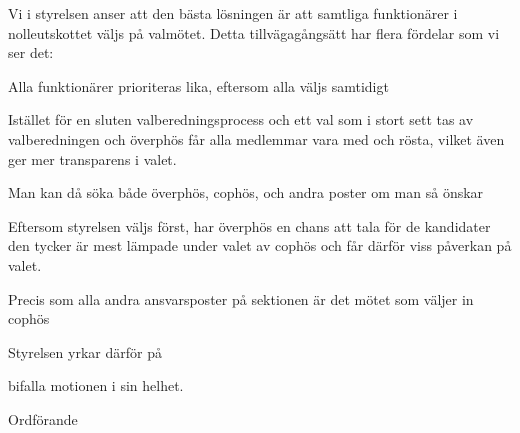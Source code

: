\documentclass[../_main/handlingar.tex]{subfiles}
\begin{document}
\motionssvar
Vi i styrelsen anser att den bästa lösningen är att samtliga funktionärer i nolleutskottet väljs på valmötet. Detta tillvägagångsätt har flera fördelar som vi ser det:

\begin{dashlist}
	\item Alla funktionärer prioriteras lika, eftersom alla väljs samtidigt
	\item Istället för en sluten valberedningsprocess och ett val som i stort sett tas av valberedningen och överphös får alla medlemmar vara med och rösta, vilket även ger mer transparens i valet.
	\item Man kan då söka både överphös, cophös, och andra poster om man så önskar
	\item Eftersom styrelsen väljs först, har överphös en chans att tala för de kandidater den tycker är mest lämpade under valet av cophös och får därför viss påverkan på valet.
	\item Precis som alla andra ansvarsposter på sektionen är det mötet som väljer in cophös
\end{dashlist}

Styrelsen yrkar därför på

\begin{attsatser}
    \att bifalla motionen i sin helhet.
\end{attsatser}


\begin{signatures}{1}
	\ist
	\signature{Daniel Bakic}{Ordförande}
\end{signatures}
\end{document}
